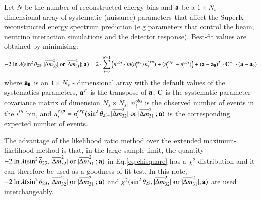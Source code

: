 Let $N$ be the number of reconstructed energy bins and
${\bf a}$ be a $1 \times N_{s}$ - dimensional array of systematic (nuisance) 
parameters that affect the SuperK reconstructed energy spectrum prediction (e.g
parameters that control the beam, neutrino interaction simulations and 
the detector response).
Best-fit values are obtained by minimising: 
\begin{equation}
\displaystyle
-2 \; \textrm{ln} \; \lambda (\sin^{2}\overline{\theta}_{23},|\overline{\Delta m}^{2}_{32}| 
    \; \textrm{or} \; |\overline{\Delta m}^{2}_{31}|
   ; {\bf a}) = 2 \cdot \sum_{i=0}^{N-1} 
   \Big( 
     n^{obs}_{i} \cdot ln(n^{obs}_{i}/n^{exp}_{i}) +
     (n^{exp}_{i}-n^{obs}_{i}) 
   \Big) +
   ({\bf a}-{\bf a_{0}})^{T} \cdot {\bf C}^{-1} \cdot ({\bf a}-{\bf a_{0}})
\label{eq:chisquare}
\end{equation}
where
${\bf a_{0}}$ is an $1 \times N_{s}$ - dimensional array with the default values of 
the systematics parameters, ${\bf a}^{T}$ is the transpose of ${\bf a}$,
${\bf C}$ is the systematic parameter covariance matrix of dimension $N_{s} \times N_{s}$,
$n^{obs}_{i}$ is the observed number of events in the $i^{th}$ bin, and
$n^{exp}_{i} = n^{exp}_{i}(\sin^{2}\overline{\theta}_{23},|\overline{\Delta m}^{2}_{32}| \; \textrm{or} \; |\overline{\Delta m}^{2}_{31}|; {\bf a})$ 
is the corresponding expected number of events.

The advantage of the likelihood ratio method over the extended maximum-likelihood method is that,
in the large-sample limit, the quantity 
$-2 \: \textrm{ln} \: \lambda (\sin^{2}\overline{\theta}_{23},|\overline{\Delta m}^{2}_{32}| \; \textrm{or} \; |\overline{\Delta m}^{2}_{31}|; {\bf a})$
in Eq.\ref{eq:chisquare} has a $\chi^{2}$ distribution and it can therefore be used as a goodness-of-fit test.
In this note,
$-2 \: \textrm{ln} \: \lambda (\sin^{2}\overline{\theta}_{23},|\overline{\Delta m}^{2}_{32}| \; \textrm{or} \; |\overline{\Delta m}^{2}_{31}|; {\bf a})$ and
$\chi^{2}(\sin^{2}\overline{\theta}_{23},|\overline{\Delta m}^{2}_{32}| \; \textrm{or} \; |\overline{\Delta m}^{2}_{31}|; {\bf a})$ are used interchangeably.


